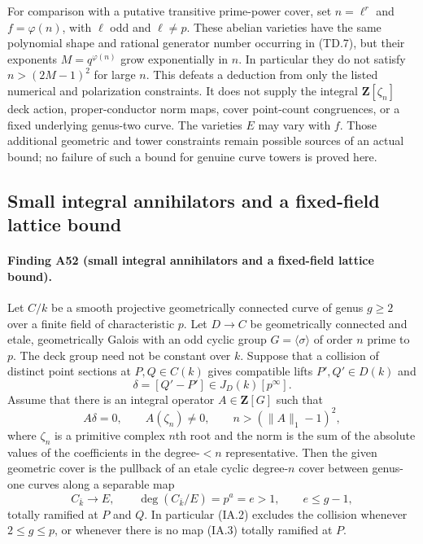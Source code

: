 \documentclass[11pt,a4paper]{article}
\begin{document}
For comparison with a putative transitive prime-power cover,
set $n=\ell^r$ and $f=\varphi(n)$, with $\ell$ odd and
$\ell\ne p$. These abelian varieties have the same polynomial
shape and rational generator number occurring in (TD.7), but
their exponents $M=q^{\varphi(n)}$ grow exponentially in $n$.
In particular they do not satisfy $n>(2M-1)^2$ for large $n$.
This defeats a deduction from only the listed numerical and
polarization constraints. It does not supply the integral
$\mathbf Z[\zeta_n]$ deck action, proper-conductor norm maps,
cover point-count congruences, or a fixed underlying genus-two
curve. The varieties $E$ may vary with $f$. Those additional
geometric and tower constraints remain possible sources of an
actual bound; no failure of such a bound for genuine curve
towers is proved here.


\subsection{Small integral annihilators and a fixed-field lattice bound}
\label{sec:small-integral-annihilator}

\paragraph{Finding A52 (small integral annihilators and a fixed-field lattice bound).}
Let $C/k$ be a smooth projective geometrically connected curve of genus
$g\ge2$ over a finite field of characteristic $p$. Let $D\to C$ be
geometrically connected and etale, geometrically Galois with an odd cyclic
group $G=\langle\sigma\rangle$ of order $n$ prime to $p$. The deck group
need not be constant over $k$. Suppose that a collision of distinct
point sections at $P,Q\in C(k)$ gives compatible lifts
$P',Q'\in D(k)$ and
\[
                  \delta=[Q'-P']\in J_D(k)[p^\infty].
\tag{IA.1}
\]
Assume that there is an integral operator $A\in\mathbf Z[G]$ such that
\[
 A\delta=0,\qquad A(\zeta_n)\ne0,\qquad
 n>(\|A\|_1-1)^2,
\tag{IA.2}
\]
where $\zeta_n$ is a primitive complex $n$th root and the norm is the
sum of the absolute values of the coefficients in the degree-$<n$
representative. Then the given geometric cover is the pullback of an
etale cyclic degree-$n$ cover between genus-one curves along a separable
map
\[
 C_{\bar k}\longrightarrow E,\qquad
 \deg(C_{\bar k}/E)=p^a=e>1,\qquad e\le g-1,
\tag{IA.3}
\]
totally ramified at $P$ and $Q$. In particular (IA.2) excludes the
collision whenever $2\le g\le p$, or whenever there is no map (IA.3)
totally ramified at $P$.
\end{document}
